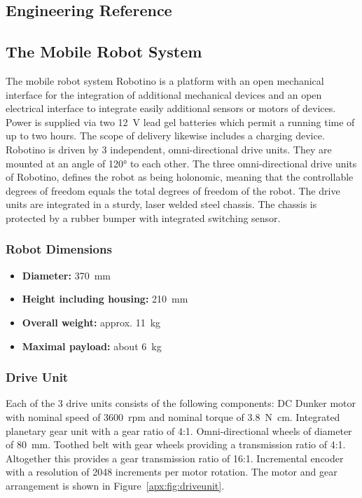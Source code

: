 \documentclass[12pt,twoside]{article}
\begin{document}

\begin{appendix}
\newpage

\section{Engineering Reference} \label{apx:sec:engref}
\subsection{The Mobile Robot System}
The mobile robot system Robotino is a platform with an open
mechanical interface for the integration of additional mechanical
devices and an open electrical interface to integrate easily
additional sensors or motors of devices. Power is supplied via two
\SI{12}{\volt} lead gel batteries which permit a running time of up to
two hours.  The scope of delivery likewise includes a charging
device. Robotino is driven by 3 independent, omni-directional drive
units. They are mounted at an angle of \ang{120} to each other. The
three omni-directional drive units of Robotino, defines the robot as
being holonomic, meaning that the controllable degrees of freedom
equals the total degrees of freedom of the robot. The drive units are
integrated in a sturdy, laser welded steel chassis. The chassis is
protected by a rubber bumper with integrated switching sensor.

\subsubsection{Robot Dimensions}\label{apx:sec:robot}
\begin{itemize}
	\item[] \textbf{Diameter:} \SI{370}{\milli\metre}
	\item[] \textbf{Height including housing:} \SI{210}{\milli\metre}
 	\item[] \textbf{Overall weight:} approx. \SI{11}{\kilogram}
 	\item[] \textbf{Maximal payload:} about \SI{6}{\kilogram}
 \end{itemize}

\subsubsection{Drive Unit}
Each of the 3 drive units consists of the following components: DC
Dunker motor with nominal speed of \SI{3600}{rpm} and nominal torque
of \SI{3.8}{\newton\centi\metre}. Integrated planetary gear unit with
a gear ratio of 4:1. Omni-directional wheels of diameter of
\SI{80}{\milli\metre}. Toothed belt with gear wheels providing a
transmission ratio of 4:1.
%
Altogether this provides a gear transmission ratio of
16:1. Incremental encoder with a resolution of 2048 increments per
motor rotation.
%
The motor and gear arrangement is shown in
Figure~\ref{apx:fig:driveunit}.


\end{appendix}
\end{document}
